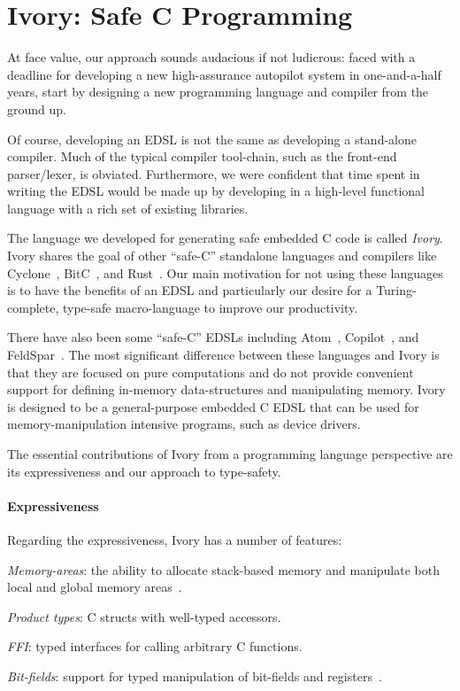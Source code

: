 \section{Ivory: Safe C Programming}
\label{sec:ivory}

At face value, our approach sounds audacious if not ludicrous: faced with a
deadline for developing a new high-assurance autopilot system in one-and-a-half
years, start by designing a new programming language and compiler from the
ground up.

Of course, developing an EDSL is not the same as developing a stand-alone
compiler.  Much of the typical compiler tool-chain, such as the front-end
parser/lexer, is obviated.  Furthermore, we were confident that time spent in
writing the EDSL would be made up by developing in a high-level functional
language with a rich set of existing libraries.

The language we developed for generating safe embedded C code is called
\emph{Ivory}.  Ivory shares the goal of other ``safe-C'' standalone languages
and compilers like Cyclone~\cite{cyclone}, BitC~\cite{bitc}, and
Rust~\cite{rust}.  Our main motivation for not using these languages is to have
the benefits of an EDSL and particularly our desire for a Turing-complete,
type-safe macro-language to improve our productivity.

There have also been some ``safe-C'' EDSLs including Atom~\cite{atom},
Copilot~\cite{copilot}, and FeldSpar~\cite{feldspar1}.  The most significant
difference between these languages and Ivory is that they are focused on pure
computations and do not provide convenient support for defining in-memory
data-structures and manipulating memory.  Ivory is designed to be a
general-purpose embedded C EDSL that can be used for memory-manipulation
intensive programs, such as device drivers.

The essential contributions of Ivory from a programming language perspective are
its expressiveness and our approach to type-safety.

\paragraph{Expressiveness}
Regarding the expressiveness, Ivory has a number of features:

\begin{compactitem}
  \item \emph{Memory-areas}: the ability to allocate stack-based memory and
    manipulate both local and global memory areas~\cite{memareas}.
  \item \emph{Product types}: C structs with well-typed accessors.
  \item \emph{FFI}: typed interfaces for calling arbitrary C functions.
  \item \emph{Bit-fields}: support for typed manipulation of bit-fields and
    registers~\cite{high-level}.
\end{compactitem}

